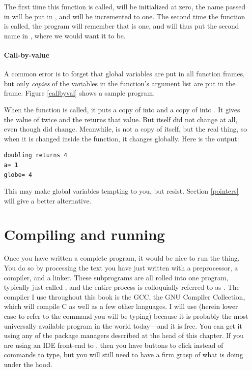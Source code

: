 \documentclass[12pt]{article}
\begin{document}
The first time this function is called, 
will be initialized at zero, the name passed in will be put in
, and  will be
incremented to one. The second time the function is called, the program
will remember that  is one, and will thus put the
second name in , where we would want it to be.

\paragraph{Call-by-value} 
A common error is to forget that global variables are put in all function
frames, but only {\sl copies} of the variables in the function's argument
list are put in the frame.  Figure \ref{callbyval} shows a sample program.


When the  function is called, it puts a copy of  into  and a copy of 
into . It gives  the value of twice  and the returns that value. But 
itself did not change at all, even though  did change. Meanwhile,  is not a copy of
itself, but the real thing, so when it is changed inside the function, it changes globally.
Here is the output:
\begin{lstlisting}
doubling returns 4
a= 1
globe= 4
\end{lstlisting}

This may make global variables tempting to you, but resist. Section \ref{pointers} will give a better
alternative.

\section{Compiling and running}\label{compilation}

Once you have written a complete program, it would be nice to run the
thing. You do so by processing the text you have just written with a
preprocessor, a compiler, and a linker. These subprograms are all rolled
into one program, typically just called , and the entire
process is colloquially referred to as . The compiler I use
throughout this book is the GCC, the GNU Compiler Collection, which will
compile C as well as a few other languages. I will use  (herein
lower case to refer to the command you will be typing) because it is probably
the most universally available program in the world today---and it is free.
You can get it using any of the package managers described at the head
of this chapter. If you are using an IDE front-end to ,
then you have buttons to click instead of commands to type, but you will
still need to have a firm grasp of what  is doing under the
hood.
\end{document}
